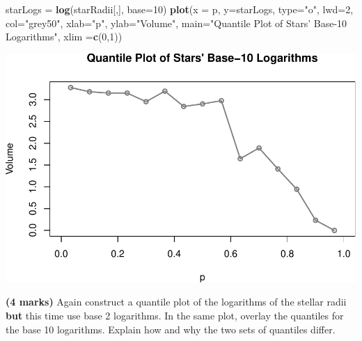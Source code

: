 \documentclass[9pt,letter]{article}
\newenvironment{Shaded}{\begin{snugshade}}{\end{snugshade}}
\newcommand{\KeywordTok}[1]{\textcolor[rgb]{0.13,0.29,0.53}{\textbf{#1}}}
\newcommand{\DataTypeTok}[1]{\textcolor[rgb]{0.13,0.29,0.53}{#1}}
\newcommand{\DecValTok}[1]{\textcolor[rgb]{0.00,0.00,0.81}{#1}}
\newcommand{\StringTok}[1]{\textcolor[rgb]{0.31,0.60,0.02}{#1}}
\newcommand{\NormalTok}[1]{#1}
\begin{document}
\begin{Shaded}
\begin{Highlighting}[]
\NormalTok{starLogs =}\StringTok{ }\KeywordTok{log}\NormalTok{(starRadii[,], }\DataTypeTok{base=}\DecValTok{10}\NormalTok{)}
\KeywordTok{plot}\NormalTok{(}\DataTypeTok{x =}\NormalTok{ p, }\DataTypeTok{y=}\NormalTok{starLogs, }
      \DataTypeTok{type=}\StringTok{"o"}\NormalTok{, }\DataTypeTok{lwd=}\DecValTok{2}\NormalTok{, }\DataTypeTok{col=}\StringTok{"grey50"}\NormalTok{,}
      \DataTypeTok{xlab=}\StringTok{"p"}\NormalTok{, }\DataTypeTok{ylab=}\StringTok{"Volume"}\NormalTok{,}
      \DataTypeTok{main=}\StringTok{"Quantile Plot of Stars' Base-10 Logarithms"}\NormalTok{,}
      \DataTypeTok{xlim =}\KeywordTok{c}\NormalTok{(}\DecValTok{0}\NormalTok{,}\DecValTok{1}\NormalTok{))}
\end{Highlighting}
\end{Shaded}

\includegraphics{a3_tests_files/figure-latex/unnamed-chunk-7-1.pdf}

\item 

\textbf{(4 marks)} Again construct a quantile plot of the logarithms of
the stellar radii \textbf{but} this time use base 2 logarithms. In the
same plot, overlay the quantiles for the base 10 logarithms. Explain how
and why the two sets of quantiles differ.
\end{document}
